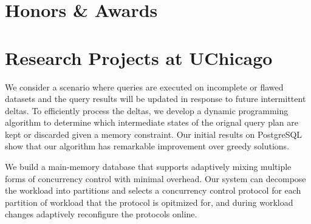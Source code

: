 \documentclass[10pt]{article} %
\begin{document}

\vspace{-5mm}


\section{Honors \& Awards}

\vspace{-5mm}

\section{Research Projects at UChicago}
{
We consider a scenario where queries are executed on incomplete or flawed datasets 
and the query results will be updated in response to future intermittent deltas. 
To efficiently process the deltas, 
we develop a dynamic programming algorithm to determine 
which intermediate states of the orignal query plan are kept or discarded given a memory constraint. 
Our initial results on PostgreSQL show that our algorithm has remarkable improvement over greedy solutions. 
}

{
We build a main-memory database that supports adaptively mixing multiple forms of concurrency control with minimal overhead. 
Our system can decompose the workload into partitions and 
selects a concurrency control protocol for each partition of workload that the protocol is opitmized for, 
and during workload changes adaptively reconfigure the protocols online.
}
\end{document}
